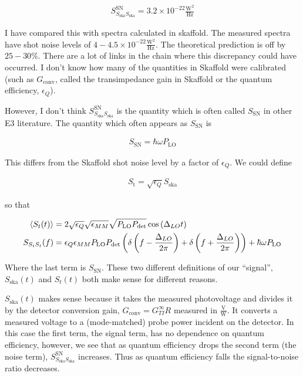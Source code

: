 \documentclass[12pt]{article}
\begin{document}
\begin{align}
S_{S_{\text{ska}}S_{\text{ska}}}^{\text{SN}} = 3.2 \times 10^{-22} \frac{\text{W}^2}{\text{Hz}}
\end{align}

I have compared this with spectra calculated in skaffold. The measured spectra have shot noise levels of $4-4.5 \times 10^{-22} \frac{\text{W}^2}{\text{Hz}}$. The theoretical prediction is off by $25-30\%$. There are a lot of links in the chain where this discrepancy could have occurred. I don't know how many of the quantities in Skaffold were calibrated (such as $G_{\text{conv}}$, called the transimpedance gain in Skaffold or the quantum efficiency, $\epsilon_Q$).

However, I don't think $S_{S_{\text{ska}}S_{\text{ska}}}^{\text{SN}}$ is the quantity which is often called $S_{\text{SN}}$ in other E3 literature. The quantity which often appears as $S_{\text{SN}}$ is

\begin{align}
S_{\text{SN}} = \hbar \omega P_{\text{LO}}
\end{align}

This differs from the Skaffold shot noise level by a factor of $\epsilon_Q$. 
We could define

\begin{align}
S_{\text{t}} = \sqrt{\epsilon_Q} S_{\text{ska}}
\end{align}

so that

\begin{align}
\Braket{S_t(t)} &= 2 \sqrt{\epsilon_Q}\sqrt{\epsilon_{MM}} \sqrt{P_{\text{LO}}P_{\text{det}}} \cos\left(\Delta_{LO} t\right)\\
S_{S_tS_t}(f) &= \epsilon_Q \epsilon_{MM}P_{\text{LO}}P_{\text{det}}\left(\delta\left(f-\frac{\Delta_{LO}}{2\pi}\right) + \delta\left(f+\frac{\Delta_{LO}}{2\pi}\right)\right) + \hbar \omega P_{\text{LO}}\\
\end{align}

Where the last term is $S_{\text{SN}}$. These two different definitions of our ``signal'', $S_{\text{ska}}(t)$ and $S_t(t)$ both make sense for different reasons.

$S_{\text{ska}}(t)$ makes sense because it takes the measured photovoltage and divides it by the detector conversion gain, $G_{\text{conv}} = G_{TI}^{\infty} R$ measured in $\frac{\text{V}}{\text{W}}$. It converts a measured voltage to a (mode-matched) probe power incident on the detector. In this case the first term, the signal term, has no dependence on quantum efficiency, however, we see that as quantum efficiency drops the second term (the noise term), $S_{S_{\text{ska}}S_{\text{ska}}}^{\text{SN}}$ increases. Thus as quantum efficiency falls the signal-to-noise ratio decreases.
\end{document}
